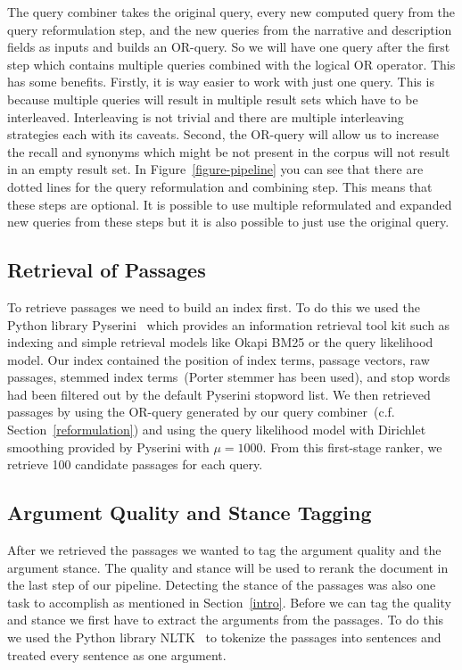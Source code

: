 The query combiner takes the original query, every new computed query from the query reformulation step, and the new queries from the narrative and description fields as inputs and builds an OR-query.
So we will have one query after the first step which contains multiple queries combined with the logical OR operator.
This has some benefits.
Firstly, it is way easier to work with just one query.
This is because multiple queries will result in multiple result sets which have to be interleaved.
Interleaving is not trivial and there are multiple interleaving strategies each with its caveats.
Second, the OR-query will allow us to increase the recall and synonyms which might be not present in the corpus will not result in an empty result set.
In Figure~\ref{figure-pipeline} you can see that there are dotted lines for the query reformulation and combining step.
This means that these steps are optional.
It is possible to use multiple reformulated and expanded new queries from these steps but it is also possible to just use the original query.

\subsection{Retrieval of Passages}\label{retrieval}

To retrieve passages we need to build an index first.
To do this we used the Python library Pyserini~\cite{LinMLYPN2021} which provides an information retrieval tool kit such as indexing and simple retrieval models like Okapi BM25 or the query likelihood model.
Our index contained the position of index terms, passage vectors, raw passages, stemmed index terms~(Porter stemmer has been used), and stop words had been filtered out by the default Pyserini stopword list.
We then retrieved passages by using the OR-query generated by our query combiner~(c.f. Section~\ref{reformulation}) and using the query likelihood model with Dirichlet smoothing provided by Pyserini with \( \mu = 1000 \).
From this first-stage ranker, we retrieve 100 candidate passages for each query.

\subsection{Argument Quality and Stance Tagging}

After we retrieved the passages we wanted to tag the argument quality and the argument stance.
The quality and stance will be used to rerank the document in the last step of our pipeline.
Detecting the stance of the passages was also one task to accomplish as mentioned in Section~\ref{intro}.
Before we can tag the quality and stance we first have to extract the arguments from the passages.
To do this we used the Python library NLTK~\cite{BirdLK2009} to tokenize the passages into sentences and treated every sentence as one argument.


